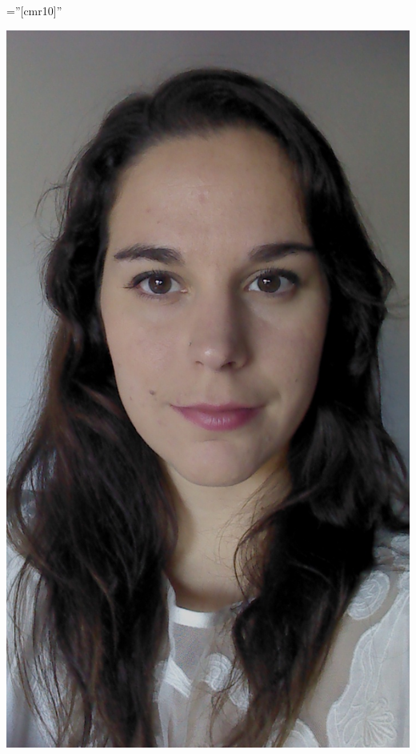 \documentclass[a4paper,10pt]{article} %
\begin{document}
\pagestyle{empty} %

\font\fb=''[cmr10]'' %

\begin{center}
\par{\bigskip\par} %
\includegraphics[scale=0.10]{foto3}
\end{center}
\end{document}

